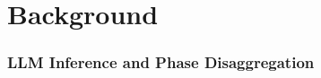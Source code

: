 \section{Background}
\label{sec:background}

\subsubsection*{\normalfont\textbf{LLM Inference and Phase Disaggregation}}
\label{sec:bg_pipeline}



